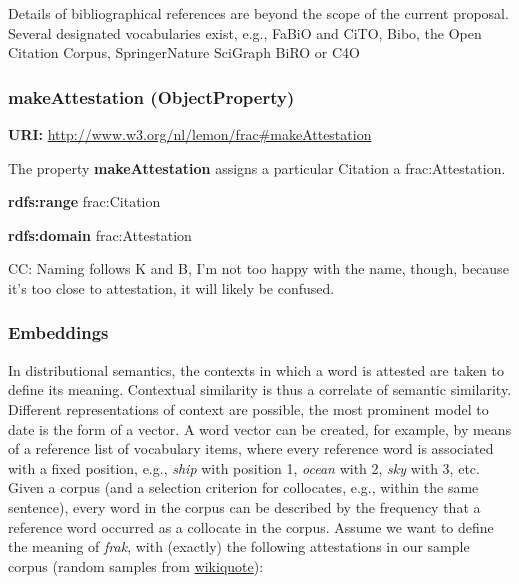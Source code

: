 \documentclass[a4paper]{article}
\newcommand\textstyleInternetlink[1]{\textcolor[rgb]{0.0,0.0,0.5019608}{#1}}
\newcommand\textstyleStrongEmphasis[1]{\textbf{#1}}
\newcommand\textstyleTeletype[1]{\textrm{#1}}
\begin{document}
Details of bibliographical references are beyond the scope of the current proposal. Several designated vocabularies exist, e.g., FaBiO and CiTO,%
%
%
 Bibo,%
%
%
 the Open Citation Corpus,%
%
%
 SpringerNature SciGraph%
%
%
 BiRO or C4O%
%
%
 

\subsubsection[makeAttestation (ObjectProperty)]{makeAttestation (ObjectProperty)}
\textstyleStrongEmphasis{URI:} \url{http://www.w3.org/nl/lemon/frac#makeAttestation}

The property \textstyleStrongEmphasis{makeAttestation} assigns a particular Citation a frac:Attestation.

\textstyleStrongEmphasis{rdfs:range} frac:Citation

\textstyleStrongEmphasis{rdfs:domain} frac:Attestation

CC: Naming follows K and B, I'm not too happy with the name, though, because it's too close to \textstyleTeletype{attestation}, it will likely be confused.

\subsubsection{Embeddings}
In distributional semantics, the contexts in which a word is attested are taken to define its meaning. Contextual similarity is thus a correlate of semantic similarity. Different representations of context are possible, the most prominent model to date is the form of a vector. A word vector can be created, for example, by means of a reference list of vocabulary items, where every reference word is associated with a fixed position, e.g., \textit{ship} with position 1, \textit{ocean} with 2, \textit{sky} with 3, etc. Given a corpus (and a selection criterion for collocates, e.g., within the same sentence), every word in the corpus can be described by the frequency that a reference word occurred as a collocate in the corpus. Assume we want to define the meaning of \textit{frak}, with (exactly) the following attestations in our sample corpus (random samples from \href{https://en.wikiquote.org/wiki/Battlestar_Galactica_(2003)}{\textstyleInternetlink{wikiquote}}): 
\end{document}
